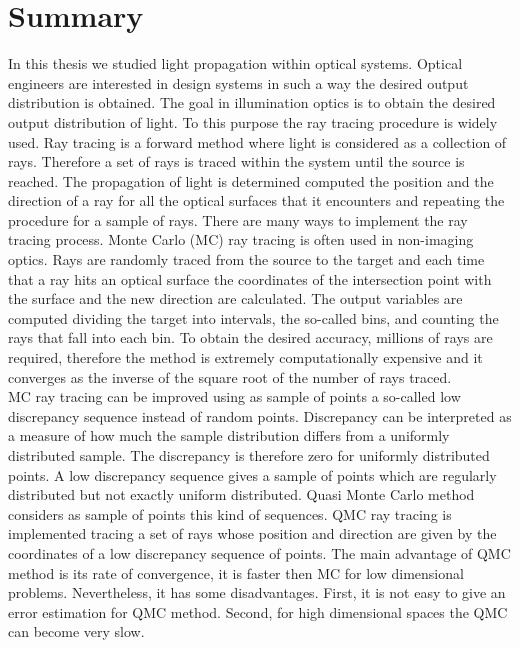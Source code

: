 \chapter*{Summary}
In this thesis we studied light propagation within optical systems.
Optical engineers are interested in design systems in such a way the desired output distribution is obtained.
The goal in illumination optics is to obtain the desired output distribution of light. To this purpose the ray tracing procedure is widely used. Ray tracing is a forward method where light is considered as a collection of rays. Therefore a set of rays is traced within the system until the source is reached. The propagation of light is determined computed the position and the direction of a ray for all the optical surfaces that it encounters and repeating the procedure for a sample of rays. There are many ways to implement the ray tracing process. Monte Carlo (MC) ray tracing is often used in non-imaging optics. Rays are randomly traced from the source to the target and each time that a ray hits an optical surface the coordinates of the intersection point with the surface and the new direction are calculated. The output variables are computed dividing the target into intervals, the so-called bins, and counting the rays that fall into each bin. To obtain the desired accuracy, millions of rays are required, therefore the method is extremely computationally expensive and it converges as the inverse of the square root of the number of rays traced. 
\\ \indent 
MC ray tracing can be improved using as sample of points a so-called low discrepancy sequence instead of random points. Discrepancy can be interpreted as a measure of how much the sample distribution differs from a uniformly distributed sample. The discrepancy is therefore zero for uniformly distributed points. A low discrepancy sequence gives a sample of points which are regularly distributed but not exactly uniform distributed. Quasi Monte Carlo method considers as sample of points this kind of sequences. QMC ray tracing is implemented tracing a set of rays whose position and direction are given by the coordinates of a low discrepancy sequence of points.
The main advantage of QMC method is its rate of convergence, it is faster then MC for low dimensional problems. Nevertheless, it has some disadvantages. First, it is not easy to give an error estimation for QMC method. Second, for high dimensional spaces the QMC can become very slow.
\\ \indent
